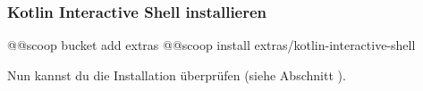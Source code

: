 \subsubsection*{Kotlin Interactive Shell installieren}
\begin{commandshell}
@\shellprefix{}@scoop bucket add extras
@\shellprefix{}@scoop install extras/kotlin-interactive-shell
\end{commandshell}
Nun kannst du die Installation überprüfen (siehe Abschnitt ).
